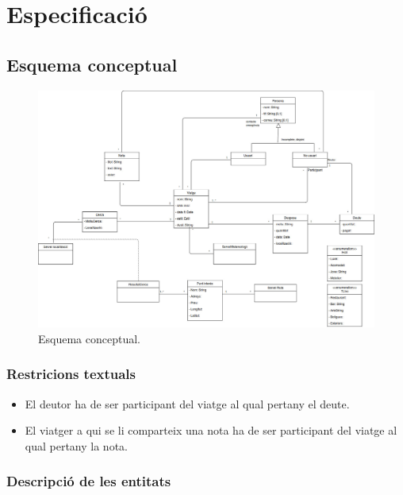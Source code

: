 
\chapter{Especificació} %

\label{Especificacio} %

\section{Esquema conceptual}


\begin{figure}[!h]
\centering
\includegraphics[scale=0.3]{Figures/UML.jpg}
\caption{Esquema conceptual.}
\end{figure}


\subsection{Restricions textuals}
\begin{itemize}
\item{}El deutor ha de ser participant del viatge al qual pertany el deute.
\item{}El viatger a qui se li comparteix una nota ha de ser participant del viatge al qual pertany la nota.
\end{itemize}

\clearpage

\subsection{Descripció de les entitats}

